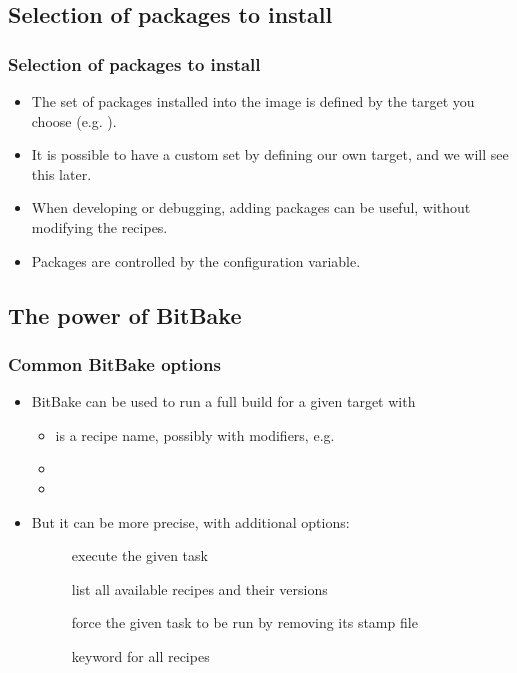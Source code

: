\subsection{Selection of packages to install}

\begin{frame}
  \frametitle{Selection of packages to install}
  \begin{itemize}
    \item The set of packages installed into the image is defined by
      the target you choose (e.g. ).
    \item It is possible to have a custom set by defining our own
      target, and we will see this later.
    \item When developing or debugging, adding packages can be useful,
      without modifying the recipes.
    \item Packages are controlled by the 
      configuration variable.
  \end{itemize}
\end{frame}

\subsection{The power of BitBake}

\begin{frame}
  \frametitle{Common BitBake options}
  \begin{itemize}
    \item BitBake can be used to run a full build for a given target
      with 
    \begin{itemize}
      \item {} is a recipe name, possibly with modifiers,
        e.g. 
      \item {}
      \item {}
    \end{itemize}
    \item But it can be more precise, with additional options:
    \begin{description}
      \item[] execute the given task
      \item[] list all available recipes and their
        versions
      \item[] force the given task to be run by removing its
        stamp file
      \item[] keyword for all recipes
    \end{description}
  \end{itemize}
\end{frame}

